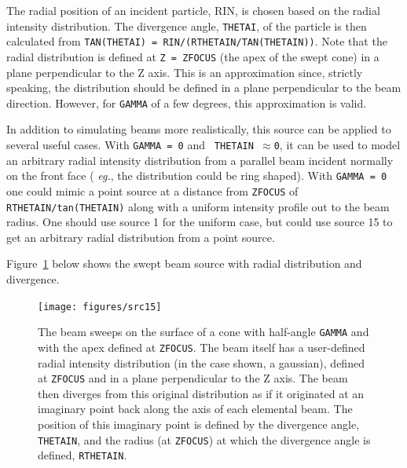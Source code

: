 \documentclass[12pt,twoside]{article}
\newcommand{\eg}{{\em eg.}}
\begin{document}
The radial position of an incident particle, RIN, is chosen based on
the radial intensity distribution.  The divergence angle, {\tt THETAI}, of the
particle is then
calculated from {\tt TAN(THETAI) = RIN/(RTHETAIN/TAN(THETAIN))}.
Note that the radial distribution is defined at {\tt Z = ZFOCUS} (the apex of the swept
cone) in a plane perpendicular to the Z axis.  This is an approximation since,
strictly speaking, the distribution should be defined in a plane perpendicular
to the beam direction.  However, for {\tt GAMMA} of a
few degrees, this approximation is valid.

In addition to simulating beams more realistically, this source can be
applied to several useful cases. With {\tt GAMMA = 0} and {\tt
THETAIN~$\approx$0}, it can be used to model an arbitrary radial intensity
distribution from a parallel beam incident normally on the front face (
\eg, the distribution could be ring shaped).  With {\tt GAMMA = 0} one
could mimic a point source at a distance from {\tt ZFOCUS} of {\tt
RTHETAIN/tan(THETAIN)} along with a uniform intensity profile out to the
beam radius. One should use source 1 for the uniform case, but could use
source 15 to get an arbitrary radial distribution from a point source.

Figure~\ref{fig_src15} below shows the swept beam source with radial
distribution and divergence.
\begin{figure}[htbp]
\vspace*{-0.35cm}
\begin{center}
\leavevmode
\mbox{}\hspace{0cm}
\texttt{[image: figures/src15]}
\caption[ISOURC=15: NRC swept beam with radial intensity distribution and
divergence]
{The beam sweeps on the surface of a cone with half-angle {\tt GAMMA} and
with the apex defined at {\tt ZFOCUS}.  The beam itself has a user-defined radial
intensity distribution (in the case shown, a gaussian), defined at {\tt ZFOCUS}
and in a plane perpendicular to the Z axis.  The beam then diverges from this
original distribution as if it originated at an imaginary point back along
the axis of each elemental beam.  The position of this imaginary point is defined by the
divergence angle, {\tt THETAIN}, and the radius (at {\tt ZFOCUS}) at which
the divergence angle is defined, {\tt RTHETAIN}.}
\label{fig_src15}
\end{center}
\end{figure}
\end{document}
